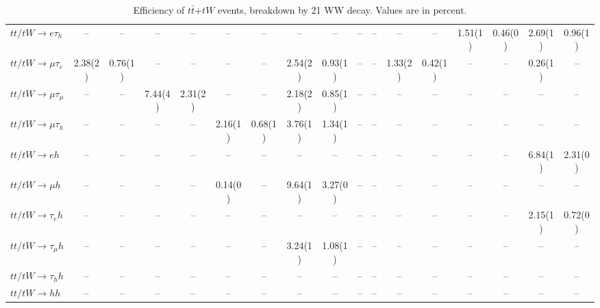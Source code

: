 \begin{sidewaystable}[p]
\begin{tabular}{|l|cc|cc|cc|cc|cc|cc|cc|cc|}
    $tt/tW \to e\tau_{h}$              &    --    &    --    &    --    &    --    &    --    &    --    &    --    &    --    &    --    &    --    &    --    &    --    &  1.51(1) &  0.46(0) &  2.69(1) &  0.96(1) \\ 
    $tt/tW \to \mu\tau_{e}$            &  2.38(2) &  0.76(1) &    --    &    --    &    --    &    --    &  2.54(2) &  0.93(1) &    --    &    --    &  1.33(2) &  0.42(1) &    --    &    --    &  0.26(1) &    --    \\ 
    $tt/tW \to \mu\tau_{\mu}$          &    --    &    --    &  7.44(4) &  2.31(2) &    --    &    --    &  2.18(2) &  0.85(1) &    --    &    --    &    --    &    --    &    --    &    --    &    --    &    --    \\ 
    $tt/tW \to \mu\tau_{h}$            &    --    &    --    &    --    &    --    &  2.16(1) &  0.68(1) &  3.76(1) &  1.34(1) &    --    &    --    &    --    &    --    &    --    &    --    &    --    &    --    \\ 
    $tt/tW \to eh$                     &    --    &    --    &    --    &    --    &    --    &    --    &    --    &    --    &    --    &    --    &    --    &    --    &    --    &    --    &  6.84(1) &  2.31(0) \\ 
    $tt/tW \to \mu h$                  &    --    &    --    &    --    &    --    &  0.14(0) &    --    &  9.64(1) &  3.27(0) &    --    &    --    &    --    &    --    &    --    &    --    &    --    &    --    \\ 
    $tt/tW \to \tau_{e}h$              &    --    &    --    &    --    &    --    &    --    &    --    &    --    &    --    &    --    &    --    &    --    &    --    &    --    &    --    &  2.15(1) &  0.72(0) \\ 
    $tt/tW \to \tau_{\mu}h$            &    --    &    --    &    --    &    --    &    --    &    --    &  3.24(1) &  1.08(1) &    --    &    --    &    --    &    --    &    --    &    --    &    --    &    --    \\ 
    $tt/tW \to \tau_{h}h$              &    --    &    --    &    --    &    --    &    --    &    --    &    --    &    --    &    --    &    --    &    --    &    --    &    --    &    --    &    --    &    --    \\ 
    $tt/tW \to hh$                     &    --    &    --    &    --    &    --    &    --    &    --    &    --    &    --    &    --    &    --    &    --    &    --    &    --    &    --    &    --    &    --    \\ 

    \hline
    \end{tabular}
    \caption{Efficiency of $t\bar{t}$+$tW$ events, breakdown by 21 WW decay.  Values are in percent.}
    \label{sigcomp}
    
\end{sidewaystable}
